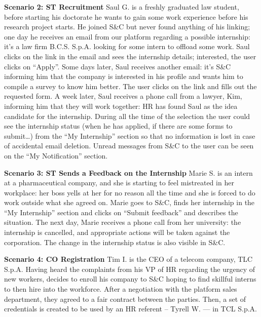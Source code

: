 \par{\textbf{Scenario 2: ST Recruitment}} Saul G. is a freshly graduated law student, before starting his doctorate he wants to
gain some work experience before his research project starts. He joined S\&C but never found anything of his linking;
one day he receives an email from our platform regarding a possible internship: it's a law firm B.C.S. S.p.A. looking
for some intern to offload some work. Saul clicks on the link in the email and sees the internship details; interested,
the user clicks on “Apply”. Some days later, Saul receives another email: it's S\&C informing him that the company is
interested in his profile and wants him to compile a survey to know him better. The user clicks on the link and fills
out the requested form. A week later, Saul receives a phone call from a lawyer, Kim, informing him that they will work
together: HR has found Saul as the idea candidate for the internship. During all the time of the selection the user
could see the internship status (when he has applied, if there are some forms to submit…) from the “My Internship”
section so that no information is lost in case of accidental email deletion. Unread messages from S\&C to the user can
be seen on the “My Notification” section.

\par{\textbf{Scenario 3: ST Sends a Feedback on the Internship}} Marie S. is an intern at a pharmaceutical company, and she is
starting to feel mistreated in her workplace: her boss yells at her for no reason all the time and she is forced to do
work outside what she agreed on. Marie goes to S\&C, finds her internship in the “My Internship” section and clicks on
“Submit feedback” and describes the situation. The next day, Marie receives a phone call from her university: the
internship is cancelled, and appropriate actions will be taken against the corporation. The change in the internship
status is also visible in S\&C.

\par{\textbf{Scenario 4: CO Registration}} Tim I. is the CEO of a telecom company, TLC S.p.A. Having heard the
complaints from his VP of HR regarding the urgency of new workers, decides to enroll his company to S\&C hoping to find
skillful interns to then hire into the workforce. After a negotiation with the platform sales department, they agreed
to a fair contract between the parties. Then, a set of credentials is created to be used by an HR referent
– Tyrell W. — in TCL S.p.A.


